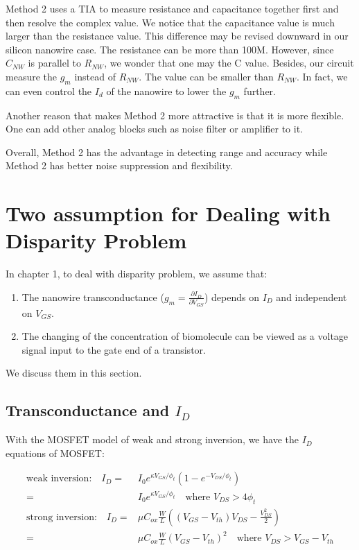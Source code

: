 Method 2 uses a TIA to measure resistance and capacitance together first and then resolve the complex value.
We notice that the capacitance value is much larger than the resistance value.
This difference may be revised downward in our silicon nanowire case.
The resistance can be more than 100M.
However, since $C_{NW}$ is parallel to $R_{NW}$, we wonder that one may the C value.
Besides, our circuit measure the $g_m$ instead of $R_{NW}$.
The value can be smaller than $R_{NW}$.
In fact, we can even control the $I_d$ of the nanowire to lower the $g_m$ further.

Another reason that makes Method 2 more attractive is that it is more flexible.
One can add other analog blocks such as noise filter or amplifier to it.

Overall, Method 2 has the advantage in detecting range and accuracy while Method 2 has better noise suppression and flexibility.



\section{Two assumption for Dealing with Disparity Problem} \label{sec:assumpDiscuss}
In chapter 1, to deal with disparity problem, we assume that:
\begin{enumerate}
    \item The nanowire transconductance ($g_m = \frac{\partial I_D}{\partial V_{GS}}$) depends on $I_D$ and independent on $V_{GS}$.
    \item The changing of the concentration of biomolecule can be viewed as a voltage signal input to the gate end of a transistor.
\end{enumerate}
We discuss them in this section.

\subsection{Transconductance and $I_D$} \label{section:IdGm}
With the MOSFET model of weak and strong inversion, we have the $I_D$ equations of MOSFET:
\setlength{\mathindent}{1.5cm}

\begin{align}
    \text{weak inversion:} \quad I_D   = & I_0e^{\kappa V_{GS}/\phi_t}(1 - e^{-V_{DS}/\phi_t})\\
                                       = & I_0e^{\kappa V_{GS}/\phi_t} \quad \text{where $V_{DS} > 4 \phi_t$ } \\
    \text{strong inversion:} \quad I_D = & \mu C_{ox} \frac{W}{L}((V_{GS} - V_{th})V_{DS} - \frac{V_{DS}^2}{2}) \\
                                       = & \mu C_{ox} \frac{W}{L}(V_{GS} - V_{th})^2 \quad \text{where $V_{DS} > V_{GS} - V_{th}$} \label{eq:ID_Strong}
\end{align}

